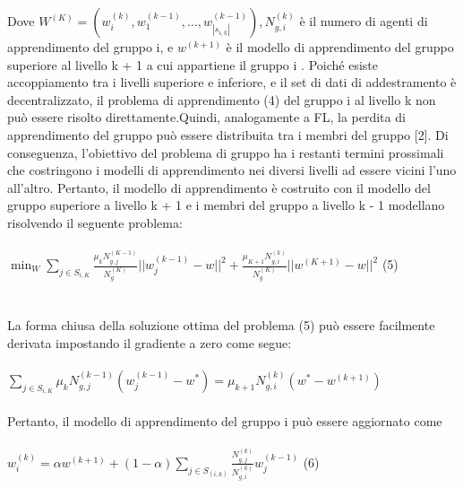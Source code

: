 \begin{itemize}
Dove $W^{(K)} = (w_i^{(k)},w_1^{(k-1)},...,w_{|s_{i,k}|}^{(k-1)}),N_{g,i}^{(k)}$ è il numero di agenti di apprendimento del gruppo i, e $w^{(k+1)}$ è il modello di apprendimento del gruppo superiore al livello k + 1 a cui appartiene il gruppo i . Poiché esiste accoppiamento tra i livelli superiore e inferiore, e il set di dati di addestramento è decentralizzato, il problema di apprendimento (4) del gruppo i al livello k non può essere risolto direttamente.Quindi, analogamente a FL, la perdita di apprendimento del gruppo può essere distribuita tra i membri del gruppo [2]. Di conseguenza, l'obiettivo del problema di gruppo ha i restanti termini prossimali che costringono i modelli di apprendimento nei diversi livelli ad essere vicini l'uno all'altro. Pertanto, il modello di apprendimento è costruito con il modello del gruppo superiore a livello k + 1 e i membri del gruppo a livello k - 1 modellano risolvendo il seguente problema:\\
\\
$\min_{W}\sum_{j\in S_{i,K}} \frac{\mu_kN_{g,j}^{(K-1)}}{N_g^{(K)}}||w_j^{(k-1)}-w||^2+\frac{\mu_{K+1}N_{g,i}^{(k)}}{N_g^{(K)}}||w^{(K+1)}-w||^2$ \hspace{1cm} (5)\\\\\\
La forma chiusa della soluzione ottima del problema (5) può essere facilmente derivata impostando il gradiente a zero come segue:\\\\
$\sum_{j\in S_{i,K}}\mu_kN_{g,j}^{(k-1)}(w_j^{(k-1)}-w^*)=\mu_{k+1}N_{g,i}^{(k)}(w^*-w^{(k+1)})$\\
\\Pertanto, il modello di apprendimento del gruppo i può essere aggiornato come\\\\
$w_i^{(k)}=\alpha w^{(k+1)}+(1-\alpha)\sum_{j\in S_{(i,k)}}\frac{N_{g,j}^{(k)}}{N_{g,i}^{(k)}}w_j^{(k-1)}$ \hspace{1cm} (6)\\\\


\end{itemize}
